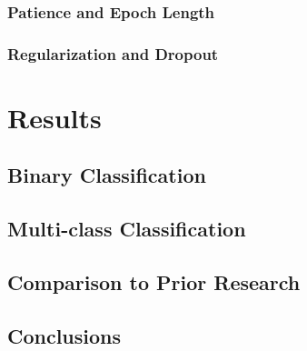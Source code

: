     \subsubsection{Patience and Epoch Length}
    \subsubsection{Regularization and Dropout}

\section{Results}
  \subsection{Binary Classification}
  \subsection{Multi-class Classification}
  \subsection{Comparison to Prior Research}
  \subsection{Conclusions}